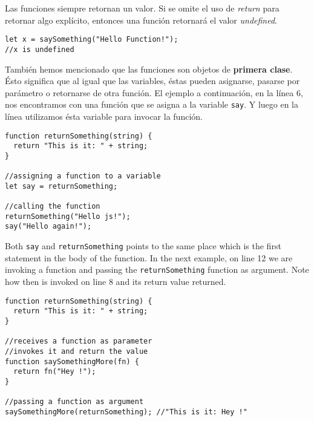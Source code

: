 \documentclass[a4paper, oneside, titlepage, 12pt]{book}
\begin{document}
Las funciones siempre retornan un valor. Si se omite el uso de \textit{return} para retornar algo explícito, entonces una función retornará el valor \textit{undefined}.

\begin{verbatim}
let x = saySomething("Hello Function!");
//x is undefined
\end{verbatim}

También hemos mencionado que las funciones son objetos de \textbf{primera clase}. Ésto significa que al igual que las variables, éstas pueden asignarse, pasarse por parámetro o retornarse de otra función. El ejemplo a continuación, en la línea 6, nos encontramos con una función que se asigna a la variable \colorbox{verylight}{\lstinline{say}}. Y luego en la línea utilizamos ésta variable para invocar la función.

\begin{verbatim}
function returnSomething(string) {
  return "This is it: " + string;
}

//assigning a function to a variable
let say = returnSomething;

//calling the function
returnSomething("Hello js!");
say("Hello again!");
\end{verbatim}

Both \texttt{say} and \texttt{returnSomething} points to the same place which is the first statement in the body of the function. In the next example, on line 12 we are invoking a function and passing the \texttt{returnSomething} function as argument. Note how then is invoked on line 8 and its return value returned.

\begin{verbatim}
function returnSomething(string) {
  return "This is it: " + string;
}

//receives a function as parameter
//invokes it and return the value
function saySomethingMore(fn) {
  return fn("Hey !");
}

//passing a function as argument
saySomethingMore(returnSomething); //"This is it: Hey !"
\end{verbatim}
\end{document}
